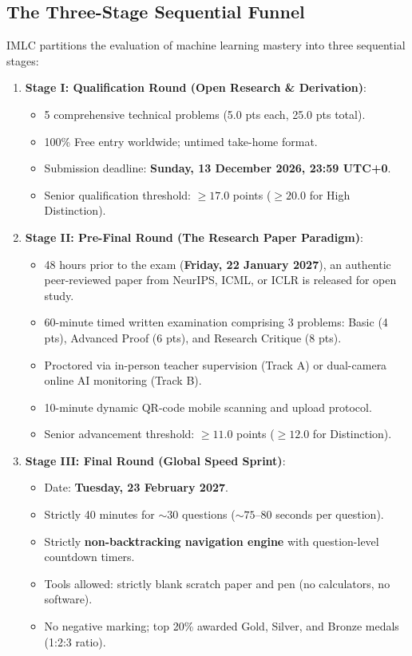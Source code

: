 \documentclass[11pt,a4paper]{article}
\theoremstyle{definition}
\theoremstyle{plain}
\theoremstyle{remark}
\begin{document}
\subsection{The Three-Stage Sequential Funnel}
IMLC partitions the evaluation of machine learning mastery into three sequential stages:
\begin{enumerate}
    \item \textbf{Stage I: Qualification Round (Open Research \& Derivation)}:
    \begin{itemize}[noitemsep]
        \item 5 comprehensive technical problems (5.0 pts each, 25.0 pts total).
        \item 100\% Free entry worldwide; untimed take-home format.
        \item Submission deadline: \textbf{Sunday, 13 December 2026, 23:59 UTC+0}.
        \item Senior qualification threshold: $\ge 17.0$ points ($\ge 20.0$ for High Distinction).
    \end{itemize}
    \item \textbf{Stage II: Pre-Final Round (The Research Paper Paradigm)}:
    \begin{itemize}[noitemsep]
        \item 48 hours prior to the exam (\textbf{Friday, 22 January 2027}), an authentic peer-reviewed paper from NeurIPS, ICML, or ICLR is released for open study.
        \item 60-minute timed written examination comprising 3 problems: Basic (4 pts), Advanced Proof (6 pts), and Research Critique (8 pts).
        \item Proctored via in-person teacher supervision (Track A) or dual-camera online AI monitoring (Track B).
        \item 10-minute dynamic QR-code mobile scanning and upload protocol.
        \item Senior advancement threshold: $\ge 11.0$ points ($\ge 12.0$ for Distinction).
    \end{itemize}
    \item \textbf{Stage III: Final Round (Global Speed Sprint)}:
    \begin{itemize}[noitemsep]
        \item Date: \textbf{Tuesday, 23 February 2027}.
        \item Strictly 40 minutes for $\sim 30$ questions ($\sim 75$--$80$ seconds per question).
        \item Strictly \textbf{non-backtracking navigation engine} with question-level countdown timers.
        \item Tools allowed: strictly blank scratch paper and pen (no calculators, no software).
        \item No negative marking; top 20\% awarded Gold, Silver, and Bronze medals (1:2:3 ratio).
    \end{itemize}
\end{enumerate}
\end{document}
